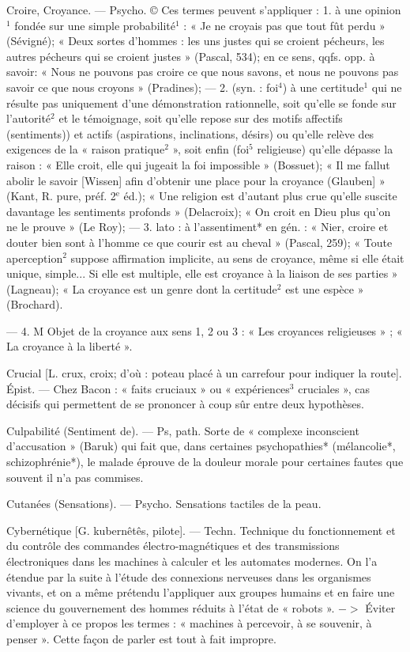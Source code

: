 Croire, Croyance. — Psycho. © Ces
termes peuvent s’appliquer : 1. à
une opinion$^1$ fondée sur une simple
probabilité$^1$ : « Je ne croyais pas que
tout fût perdu » (Sévigné); « Deux
sortes d'hommes : les uns justes qui
se croient pécheurs, les autres pécheurs qui se croient justes » (Pascal,
534); en ce sens, qqfs. opp. à savoir:
« Nous ne pouvons pas croire ce que
nous savons, et nous ne pouvons
pas savoir ce que nous croyons »
(Pradines); — 2. (syn. : foi$^4$) à une
certitude$^1$ qui ne résulte pas uniquement d'une démonstration rationnelle, soit qu’elle se fonde sur l’autorité$^2$ et le témoignage, soit qu'elle
repose sur des motifs affectifs (sentiments)) et actifs (aspirations, inclinations, désirs) ou qu'elle relève des
exigences de la « raison pratique$^2$ »,
soit enfin (foi$^5$ religieuse) qu’elle
dépasse la raison : « Elle croit, elle
qui jugeait la foi impossible »
(Bossuet); « Il me fallut abolir le
savoir [Wissen] afin d'obtenir une
place pour la croyance (Glauben] »
(Kant, R. pure, préf. 2$^\text{e}$ éd.); « Une
religion est d’autant plus crue qu’elle
suscite davantage les sentiments
profonds » (Delacroix); « On croit en
Dieu plus qu’on ne le prouve » (Le
Roy); — 3. lato : à l'assentiment* en
gén. : « Nier, croire et douter bien
sont à l’homme ce que courir est au
cheval » (Pascal, 259); « Toute aperception$^2$ suppose affirmation implicite, au sens de croyance, même si
elle était unique, simple... Si elle
est multiple, elle est croyance à la
liaison de ses parties » (Lagneau);
« La croyance est un genre dont
la certitude$^2$ est une espèce » (Brochard).

— 4. M Objet de la croyance aux
sens 1, 2 ou 3 : « Les croyances religieuses » ; « La croyance à la liberté ».

Crucial [L. crux, croix; d’où : poteau
placé à un carrefour pour indiquer
la route]. Épist. — Chez Bacon :
« faits cruciaux » ou « expériences$^3$
cruciales », cas décisifs qui permettent de se prononcer à coup sûr entre
deux hypothèses.

Culpabilité (Sentiment de). — Ps,
path. Sorte de « complexe inconscient
d’accusation » (Baruk) qui fait que,
dans certaines psychopathies* (mélancolie*, schizophrénie*), le malade
éprouve de la douleur morale pour
certaines fautes que souvent il n’a
pas commises.

Cutanées (Sensations). — Psycho. Sensations tactiles de la peau.

Cybernétique [G. kubernêtês, pilote]. —
Techn. Technique du fonctionnement et du contrôle des commandes
électro-magnétiques et des transmissions électroniques dans les machines à calculer et les automates
modernes. On l’a étendue par la suite
à l’étude des connexions nerveuses
dans les organismes vivants, et on a
même prétendu l'appliquer aux
groupes humains et en faire une
science du gouvernement des hommes réduits à l’état de « robots ».
$->$ Éviter d'employer à ce propos
les termes : « machines à percevoir,
à se souvenir, à penser ». Cette façon
de parler est tout à fait impropre.

